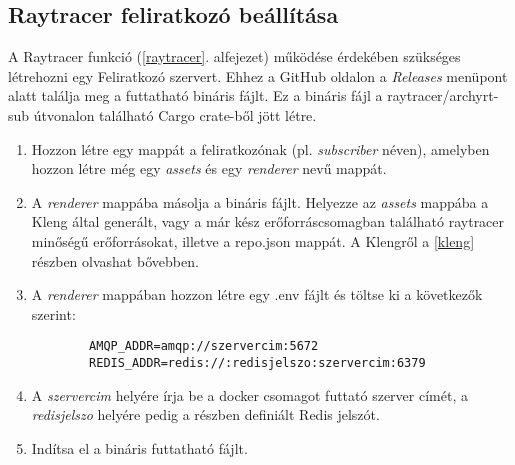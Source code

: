 \subsection{Raytracer feliratkozó beállítása}\label{subscriber}


A Raytracer funkció (\ref{raytracer}. alfejezet) működése érdekében szükséges létrehozni egy Feliratkozó szervert.
Ehhez a GitHub oldalon a \emph{Releases} menüpont alatt találja meg a futtatható bináris fájlt.
Ez a bináris fájl a raytracer/archyrt-sub útvonalon található Cargo crate-ből jött létre.


\begin{enumerate}
    \item Hozzon létre egy mappát a feliratkozónak (pl. \emph{subscriber} néven), amelyben hozzon létre még egy \emph{assets} és egy \emph{renderer} nevű mappát.

    \item A \emph{renderer} mappába másolja a bináris fájlt. Helyezze az \emph{assets} mappába a Kleng által generált, vagy a már kész erőforráscsomagban található raytracer minőségű erőforrásokat, illetve a repo.json mappát. A Klengről a \ref{kleng} részben olvashat bővebben.

    \item A \emph{renderer} mappában hozzon létre egy .env fájlt és töltse ki a következők szerint:
          \begin{lstlisting}
        AMQP_ADDR=amqp://szervercim:5672
        REDIS_ADDR=redis://:redisjelszo:szervercim:6379\end{lstlisting}

    \item A \emph{szervercim} helyére írja be a docker csomagot futtató szerver címét, a \emph{redisjelszo} helyére pedig a \textbf{} részben definiált Redis jelszót.

    \item Indítsa el a bináris futtatható fájlt.
\end{enumerate}